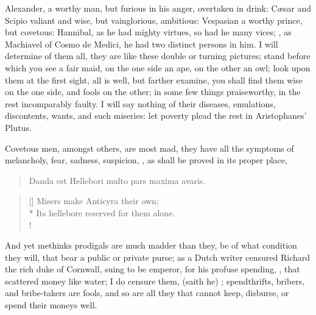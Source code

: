 Alexander, a worthy man, but furious in his anger, overtaken in drink:
C\ae{}sar and Scipio valiant and wise, but vainglorious, ambitious:
Vespasian a worthy prince, but covetous: Hannibal, as he had
mighty virtues, so had he many vices; , as Machiavel of Cosmo de Medici, he had two distinct
persons in him. I will determine of them all, they are like these
double or turning pictures; stand before which you see a fair maid, on
the one side an ape, on the other an owl; look upon them at the first
sight, all is well, but farther examine, you shall find them wise on
the one side, and fools on the other; in some few things praiseworthy,
in the rest incomparably faulty. I will say nothing of their diseases,
emulations, discontents, wants, and such miseries: let poverty plead
the rest in Aristophanes' Plutus.

Covetous men, amongst others, are most mad, they have all the
symptoms of melancholy, fear, sadness, suspicion, \etc{}, as shall be
proved in its proper place,
%
\begin{verse}
\textlatin{Danda est Hellebori multo pars maxima avaris.}
\end{verse}
\translationrule
\settowidth{\versewidth}{Its hellebore reserved for them alone.}
\begin{verse}[\versewidth]
Misers make Anticyra their own;\\*
Its hellebore reserved for them alone.\\!
\end{verse}

And yet methinks prodigals are much madder than they, be of what
condition they will, that bear a public or private purse; as a
Dutch writer censured Richard the rich duke of Cornwall, suing to
be emperor, for his profuse spending, , that scattered money like water; I do
censure them,  (saith he) ; spendthrifts, bribers, and bribe-takers are fools, and so
are all they that cannot keep, disburse, or spend their moneys
well.

